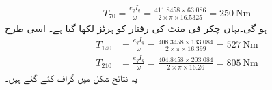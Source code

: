 \begin{itemize}
\begin{align*}
T_{70}=\frac{e_q I_q}{\omega}=\frac{411.8458 \times 63.086}{2 \times \pi \times 16.5325}=\SI{250}{\newton \meter}
\end{align*}
ہو گی۔یہاں  چکر فی منٹ کی رفتار کو  ہرٹز لکھا گیا ہے۔ اسی طرح
\begin{align*}
T_{140}&=\frac{e_q I_q}{\omega}=\frac{408.3458 \times 133.084}{2 \times \pi \times 16.399}=\SI{527}{\newton \meter}\\
T_{210}&=\frac{e_q I_q}{\omega}=\frac{404.8458 \times  203.084}{2 \times \pi \times 16.26}=\SI{805}{\newton \meter}
\end{align*}
یہ نتائج شکل  میں گراف کئے گئے ہیں۔
\end{itemize}

